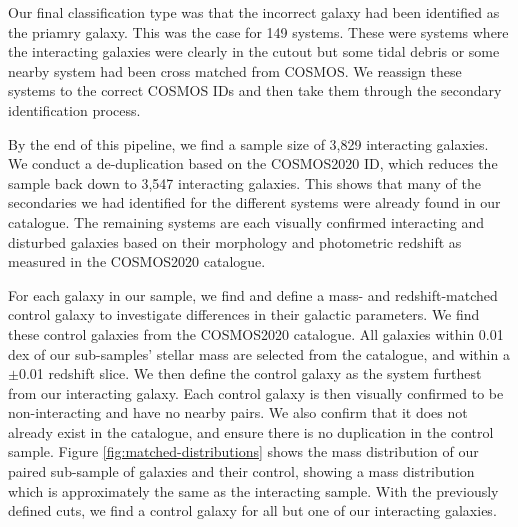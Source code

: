 Our final classification type was that the incorrect galaxy had been identified as the priamry galaxy. This was the case for 149 systems. These were systems where the interacting galaxies were clearly in the cutout but some tidal debris or some nearby system had been cross matched from COSMOS. We reassign these systems to the correct COSMOS IDs and then take them through the secondary identification process.

By the end of this pipeline, we find a sample size of 3,829 interacting galaxies. We conduct a de-duplication based on the COSMOS2020 ID, which reduces the sample back down to 3,547 interacting galaxies. This shows that many of the secondaries we had identified for the different systems were already found in our catalogue. The remaining systems are each visually confirmed interacting and disturbed galaxies based on their morphology and photometric redshift as measured in the COSMOS2020 catalogue.

For each galaxy in our sample, we find and define a mass- and redshift-matched control galaxy to investigate differences in their galactic parameters. We find these control galaxies from the COSMOS2020 catalogue. All galaxies within 0.01 dex of our sub-samples' stellar mass are selected from the catalogue, and within a $\pm$0.01 redshift slice. We then define the control galaxy as the system furthest from our interacting galaxy. Each control galaxy is then visually confirmed to be non-interacting and have no nearby pairs. We also confirm that it does not already exist in the catalogue, and ensure there is no duplication in the control sample. Figure \ref{fig:matched-distributions} shows the mass distribution of our paired sub-sample of galaxies and their control, showing a mass distribution which is approximately the same as the interacting sample. With the previously defined cuts, we find a control galaxy for all but one of our interacting galaxies.

